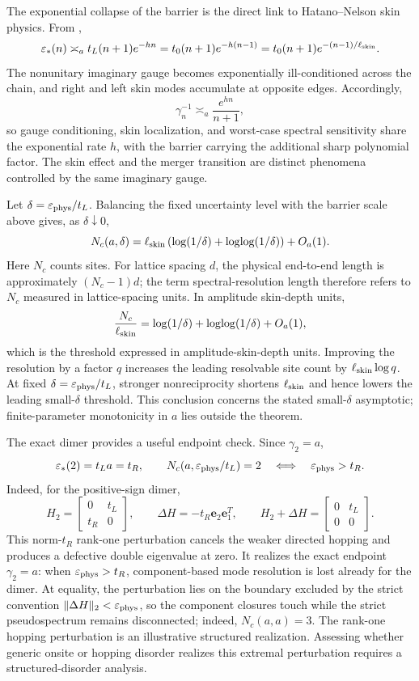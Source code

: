 \documentclass[12pt,anonymous]{iopjournal}
\numberwithin{equation}{section}
\theoremstyle{remark}
\begin{document}
The exponential collapse of the barrier is the direct link to
Hatano--Nelson skin physics.  From ,
\[
 \varepsilon_*(n)
 \asymp_a t_L(n+1)e^{-hn}
 =t_0(n+1)e^{-h(n-1)}
 =t_0(n+1)e^{-(n-1)/\ell_{\rm skin}}.
\]
The nonunitary imaginary gauge becomes exponentially ill-conditioned across
the chain, and right and left skin modes accumulate at opposite edges.
Accordingly,
\[
 \gamma_n^{-1}\asymp_a\frac{e^{hn}}{n+1},
\]
so gauge conditioning, skin localization, and worst-case spectral
sensitivity share the exponential rate \(h\), with the barrier carrying the
additional sharp polynomial factor.  The skin effect and the merger
transition are distinct phenomena controlled by the same imaginary gauge.

Let \(\delta=\varepsilon_{\rm phys}/t_L\).  Balancing the fixed uncertainty
level with the barrier scale above gives, as \(\delta\downarrow0\),
\[
 N_c(a,\delta)=\ell_{\rm skin}
\left(\log(1/\delta)+\log\!\log(1/\delta)\right)+O_a(1).
\]
Here \(N_c\) counts sites.  For lattice spacing \(d\), the physical
end-to-end length is approximately \((N_c-1)d\); the term
spectral-resolution length therefore refers to \(N_c\) measured in
lattice-spacing units.  In amplitude skin-depth units,
\[
 \frac{N_c}{\ell_{\rm skin}}
 =\log(1/\delta)+\log\!\log(1/\delta)+O_a(1),
\]
which is the threshold expressed in amplitude-skin-depth units.  Improving
the resolution by a factor \(q\) increases the leading
resolvable site count by \(\ell_{\rm skin}\log q\).  At fixed
\(\delta=\varepsilon_{\rm phys}/t_L\), stronger nonreciprocity shortens
\(\ell_{\rm skin}\) and hence lowers the leading small-\(\delta\) threshold.
This conclusion concerns the stated small-\(\delta\) asymptotic;
finite-parameter monotonicity in \(a\) lies outside the theorem.

The exact dimer provides a useful endpoint check.  Since \(\gamma_2=a\),
\[
 \varepsilon_*(2)=t_La=t_R,
 \qquad
 N_c(a,\varepsilon_{\rm phys}/t_L)=2
 \quad\Longleftrightarrow\quad
 \varepsilon_{\rm phys}>t_R.
\]
Indeed, for the positive-sign dimer,
\[
 H_2=\begin{bmatrix}0&t_L\\t_R&0\end{bmatrix},
 \qquad
 \Delta H=-t_R\mathbf e_2\mathbf e_1^T,
 \qquad
 H_2+\Delta H=\begin{bmatrix}0&t_L\\0&0\end{bmatrix}.
\]
This norm-\(t_R\) rank-one perturbation cancels the weaker directed hopping
and produces a defective double eigenvalue at zero.  It realizes the exact
endpoint \(\gamma_2=a\): when
\(\varepsilon_{\rm phys}>t_R\), component-based mode resolution is lost
already for the dimer.  At equality, the perturbation lies on the boundary
excluded by the strict convention
\(\lVert\Delta H\rVert_2<\varepsilon_{\rm phys}\), so the component closures
touch while the strict pseudospectrum remains disconnected; indeed,
\(N_c(a,a)=3\).  The rank-one hopping perturbation is an illustrative
structured realization.  Assessing whether generic onsite or hopping
disorder realizes this extremal perturbation requires a
structured-disorder analysis.
\end{document}
